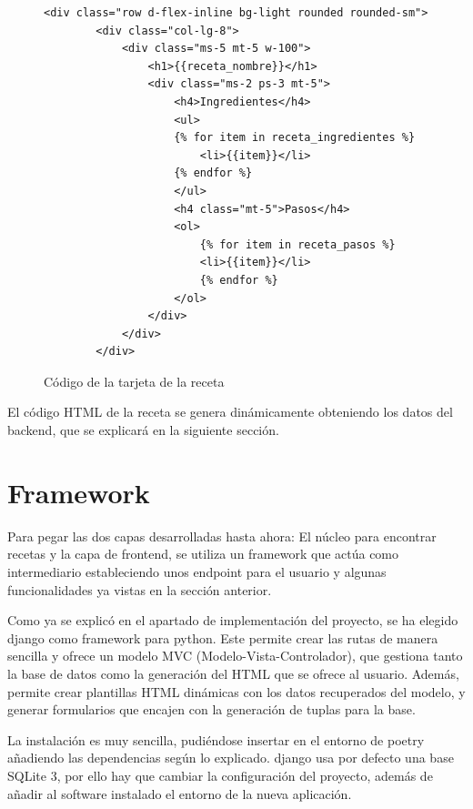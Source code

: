 \begin{figure}
\begin{lstlisting}[style=consola]
    <div class="row d-flex-inline bg-light rounded rounded-sm">
        <div class="col-lg-8">
            <div class="ms-5 mt-5 w-100">
                <h1>{{receta_nombre}}</h1>
                <div class="ms-2 ps-3 mt-5">
                    <h4>Ingredientes</h4>
                    <ul>
                    {% for item in receta_ingredientes %}
                        <li>{{item}}</li>
                    {% endfor %}
                    </ul>
                    <h4 class="mt-5">Pasos</h4>
                    <ol>
                        {% for item in receta_pasos %}
                        <li>{{item}}</li>
                        {% endfor %}
                    </ol>
                </div>
            </div>
        </div>
\end{lstlisting}
\caption{Código de la tarjeta de la receta}
\label{sni:}
\end{figure}

El código \gls{HTML} de la receta se genera dinámicamente obteniendo los datos del \gls{backend}, que se explicará en la siguiente sección.

\section{Framework}
Para pegar las dos capas desarrolladas hasta ahora: El núcleo para encontrar recetas y la capa de \gls{frontend}, se utiliza un \gls{framework} que actúa como intermediario estableciendo unos \gls{endpoint} para el usuario y algunas funcionalidades ya vistas en la sección anterior. 

Como ya se explicó en el apartado de implementación del proyecto, se ha elegido \gls{django} como \gls{framework} para \gls{python}. Este permite crear las rutas de manera sencilla y ofrece un modelo \gls{MVC} (Modelo-Vista-Controlador), que gestiona tanto la base de datos como la generación del \gls{HTML} que se ofrece al usuario. Además, permite crear plantillas \gls{HTML} dinámicas con los datos recuperados del modelo, y generar formularios que encajen con la generación de \glspl{tupla} para la \gls{base}. 

La instalación es muy sencilla, pudiéndose insertar en el entorno de \gls{poetry} añadiendo las dependencias según lo explicado. \gls{django} usa por defecto una \gls{base} SQLite 3, por ello hay que cambiar la configuración del proyecto, además de añadir al software instalado el entorno de la nueva aplicación.

